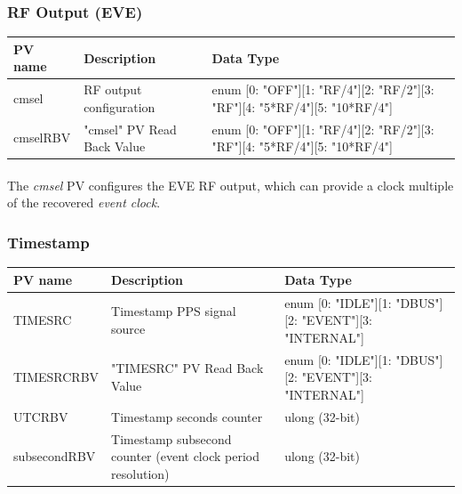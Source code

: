 \documentclass[openany]{article}
\begin{document}
		\subsubsection{RF Output (EVE)}\label{pvgroup:eve-rf-output}
			\begin{center}
			\begin{tabular}{| m{2.8cm} m{6cm} m{6cm} |}
			    \hline
			    \bfseries PV name & \bfseries Description & \bfseries Data Type \\ \hline
			    cmsel & RF output configuration & enum [0: "OFF"][1: "RF/4"][2: "RF/2"][3: "RF"][4: "5*RF/4"][5: "10*RF/4"] \\ \hline
			    cmselRBV & "cmsel" PV Read Back Value & enum [0: "OFF"][1: "RF/4"][2: "RF/2"][3: "RF"][4: "5*RF/4"][5: "10*RF/4"] \\ \hline
			\end{tabular}
			\end{center}

			\paragraph{} The \emph{cmsel} PV configures the EVE RF output, which can provide a clock multiple of the recovered \emph{event clock}.

		\subsubsection{Timestamp}\label{pvgroup:evre-timestamp}
			\begin{center}
			\begin{tabular}{| m{2.8cm} m{6cm} m{6cm} |}
			    \hline
			    \bfseries PV name & \bfseries Description & \bfseries Data Type \\ \hline
			    TIMESRC & Timestamp PPS signal source & enum [0: "IDLE"][1: "DBUS"][2: "EVENT"][3: "INTERNAL"] \\ \hline
			    TIMESRCRBV & "TIMESRC" PV Read Back Value & enum [0: "IDLE"][1: "DBUS"][2: "EVENT"][3: "INTERNAL"] \\ \hline
			    UTCRBV & Timestamp seconds counter & ulong (32-bit) \\ \hline
			    subsecondRBV & Timestamp subsecond counter (event clock period resolution) & ulong (32-bit) \\ \hline
			\end{tabular}
			\end{center}
\end{document}
